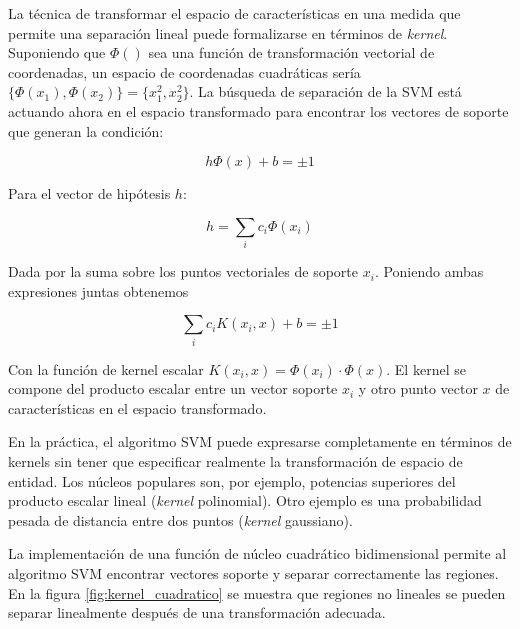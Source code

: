 \documentclass[12pt,spanish,a4paper]{article}
\numberwithin{equation}{section}
\begin{document}
La técnica de transformar el espacio de características en una medida
que permite una separación lineal puede formalizarse en términos de
\emph{kernel}. Suponiendo que \(\Phi ()\) sea una función de
transformación vectorial de coordenadas, un espacio de coordenadas
cuadráticas sería \(\{\Phi (x_1), \Phi (x_2) \} = \{x_1^2, x_2^2 \}\).
La búsqueda de separación de la SVM está actuando ahora en el espacio
transformado para encontrar los vectores de soporte que generan la
condición:

\begin{equation}
h \Phi (x) + b = \pm 1
\end{equation}

Para el vector de hipótesis \(h\):

\begin{equation}
h = \sum_i c_i \Phi \left(x_i\right)
\end{equation}

Dada por la suma sobre los puntos vectoriales de soporte \(x_i\).
Poniendo ambas expresiones juntas obtenemos

\begin{equation}
\sum_i c_i K\left( x_i, x\right) + b = \pm 1
\end{equation}

Con la función de kernel escalar
\(K\left(x_i, x\right) = \Phi\left(x_i\right)\cdot \Phi\left(x\right)\).
El kernel se compone del producto escalar entre un vector soporte
\(x_i\) y otro punto vector \(x\) de características en el espacio
transformado.

En la práctica, el algoritmo SVM puede expresarse completamente en
términos de kernels sin tener que especificar realmente la
transformación de espacio de entidad. Los núcleos populares son, por
ejemplo, potencias superiores del producto escalar lineal (\emph{kernel}
polinomial). Otro ejemplo es una probabilidad pesada de distancia entre
dos puntos (\emph{kernel} gaussiano).

La implementación de una función de núcleo cuadrático bidimensional
permite al algoritmo SVM encontrar vectores soporte y separar
correctamente las regiones. En la figura \ref{fig:kernel_cuadratico} se
muestra que regiones no lineales se pueden separar linealmente después
de una transformación adecuada.
\end{document}
